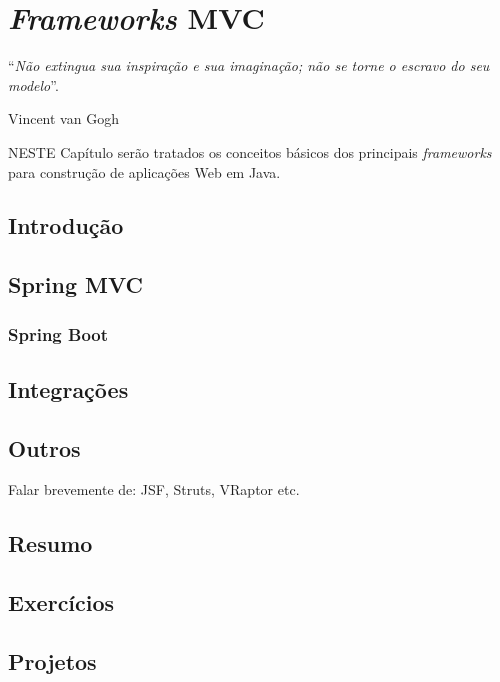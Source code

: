 \chapter{\textit{Frameworks} MVC}\label{cap:frameworksMVC}
\epigraph{``\textit{Não extingua sua inspiração e sua imaginação; não se torne o escravo do seu modelo}''.}{Vincent van Gogh}

\lettrine[lines=4, lhang=0.1, lraise=0, loversize=0.2, findent=0.1em]{\textcolor{corAzulTema}{N}}{ESTE} Capítulo serão tratados os conceitos básicos dos principais \textit{frameworks} para construção de aplicações Web em Java.

\section{Introdução}

\section{Spring MVC}

\subsection{Spring Boot}

\section{Integrações}

\section{Outros}

Falar brevemente de: JSF, Struts, VRaptor etc.

\section{Resumo}

\section{Exercícios}

\section{Projetos}

